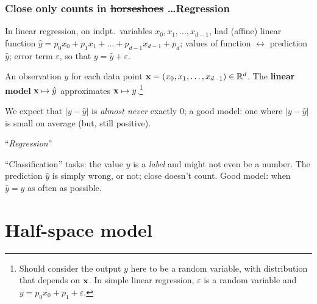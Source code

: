 \documentclass{beamer}
\theoremstyle{example}
\begin{document}
\begin{frame}
\frametitle{Close only counts in \sout{horseshoes} \ldots Regression}
In linear regression, on indpt.\ variables $x_0,x_1,\ldots,x_{d-1}$, had (affine) linear function $\hat{y} = p_0x_0+p_1x_{1}+\ldots+p_{d-1}x_{d-1} + p_d$; \newline 
values of function $\leftrightarrow$ prediction $\hat{y}$; error term $\varepsilon$, so that $y = \hat{y} + \varepsilon$.

\pause
An observation $y$ for each data point ${\bf x} = (x_0,x_1,\ldots,x_{d-1}) \in \mathbb R^d$.  The \textbf{linear model} ${\bf x} \mapsto \hat{y}$ approximates ${\bf x} \mapsto y$.\footnote{Should consider the output $y$ here to be a random variable, with distribution that depends on ${\bf x}$. In simple linear regression, $\varepsilon$ is a random variable and $y = p_0x_0 + p_1 + \varepsilon$.} 

\pause
We expect that $|y - \hat{y}|$ is \emph{almost never} exactly 0; a good model: one where $|y - \hat{y}|$ is small on average (but, still positive).
\begin{center}``\emph{Regression}''\end{center}

\pause 
``Classification'' tasks: the value $y$ is a \emph{label} and might not even be a number. The prediction $\hat{y}$ is simply wrong, or not; close doesn't count. Good model: when
$\hat{y} = y$ as often as possible.
\end{frame}

\section{Half-space model}
\end{document}
